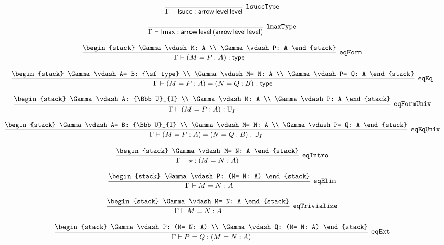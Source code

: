 \[
\infer[{\tt lsuccType}]{\Gamma \vdash {\sf lsucc}: {\sf arrow}\,{\sf level}\,{\sf level}}{}
\]

\[
\infer[{\tt lmaxType}]{\Gamma \vdash {\sf lmax}: {\sf arrow}\,{\sf level}\,({\sf arrow}\,{\sf level}\,{\sf level})}{}
\]

\[
\infer[{\tt eqForm}]{\Gamma \vdash (M= P: A): {\sf type}}{
\begin{stack}
\Gamma \vdash M: A
\\
\Gamma \vdash P: A
\end{stack}}
\]

\[
\infer[{\tt eqEq}]{\Gamma \vdash (M= P: A)= (N= Q: B): {\sf type}}{
\begin{stack}
\Gamma \vdash A= B: {\sf type}
\\
\Gamma \vdash M= N: A
\\
\Gamma \vdash P= Q: A
\end{stack}}
\]

\[
\infer[{\tt eqFormUniv}]{\Gamma \vdash (M= P: A): {\Bbb U}_{I}}{
\begin{stack}
\Gamma \vdash A: {\Bbb U}_{I}
\\
\Gamma \vdash M: A
\\
\Gamma \vdash P: A
\end{stack}}
\]

\[
\infer[{\tt eqEqUniv}]{\Gamma \vdash (M= P: A)= (N= Q: B): {\Bbb U}_{I}}{
\begin{stack}
\Gamma \vdash A= B: {\Bbb U}_{I}
\\
\Gamma \vdash M= N: A
\\
\Gamma \vdash P= Q: A
\end{stack}}
\]

\[
\infer[{\tt eqIntro}]{\Gamma \vdash \star : (M= N: A)}{
\begin{stack}
\Gamma \vdash M= N: A
\end{stack}}
\]

\[
\infer[{\tt eqElim}]{\Gamma \vdash M= N: A}{
\begin{stack}
\Gamma \vdash P: (M= N: A)
\end{stack}}
\]

\[
\infer[{\tt eqTrivialize}]{\Gamma \vdash M= N: A}{
\begin{stack}
\Gamma \vdash M= N: A
\end{stack}}
\]

\[
\infer[{\tt eqExt}]{\Gamma \vdash P= Q: (M= N: A)}{
\begin{stack}
\Gamma \vdash P: (M= N: A)
\\
\Gamma \vdash Q: (M= N: A)
\end{stack}}
\]

